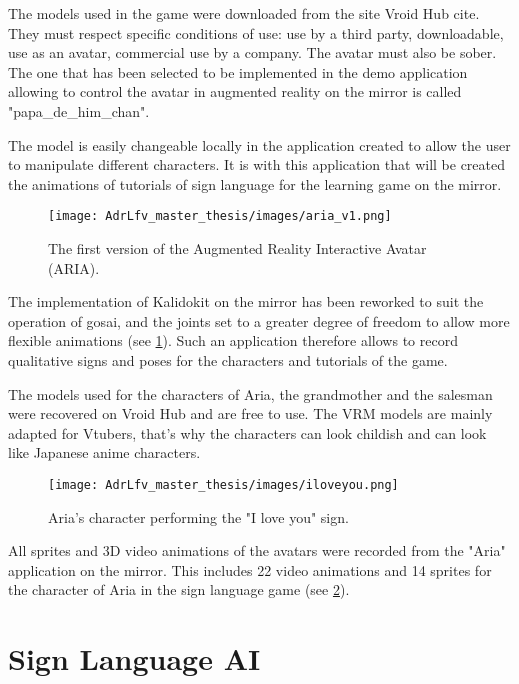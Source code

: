 The models used in the game were downloaded from the site Vroid Hub cite\cite{vroid}. They must respect specific conditions of use: use by a third party, downloadable, use as an avatar, commercial use by a company. The avatar must also be sober. The one that has been selected to be implemented in the demo application allowing to control the avatar in augmented reality on the mirror is called "papa\_de\_him\_chan". 

The model is easily changeable locally in the application created to allow the user to manipulate different characters. It is with this application that will be created the animations of tutorials of sign language for the learning game on the mirror.

\begin{figure}[h]
    \centering
    \texttt{[image: AdrLfv\_master\_thesis/images/aria\_v1.png]}
    \caption{The first version of the Augmented Reality Interactive Avatar (ARIA).}
    \label{fig:aria_v1}
\end{figure}

The implementation of Kalidokit on the mirror has been reworked to suit the operation of gosai, and the joints set to a greater degree of freedom to allow more flexible animations (see \ref{fig:aria_v1}).
Such an application therefore allows to record qualitative signs and poses for the characters and tutorials of the game.

The models used for the characters of Aria, the grandmother and the salesman were recovered on Vroid Hub and are free to use. The VRM models are mainly adapted for Vtubers, that's why the characters can look childish and can look like Japanese anime characters.

\begin{figure}[h]
    \centering
    \texttt{[image: AdrLfv\_master\_thesis/images/iloveyou.png]}
    \caption{Aria's character performing the "I love you" sign.}
    \label{fig:iloveyou}
\end{figure}

All sprites and 3D video animations of the avatars were recorded from the "Aria" application on the mirror. This includes 22 video animations and 14 sprites for the character of Aria in the sign language game (see \ref{fig:iloveyou}).

\section{Sign Language AI}

